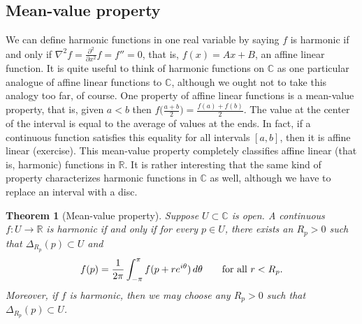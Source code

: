 \documentclass[12pt,openany]{book}
\newcommand{\avoidbreak}{\postdisplaypenalty=100}
\newcommand{\C}{{\mathbb{C}}}
\newcommand{\R}{{\mathbb{R}}}
\theoremstyle{plain}
\newtheorem{thm}{Theorem}[section]
\theoremstyle{remark}
\theoremstyle{definition}
\theoremstyle{exercise}
\theoremstyle{example}
\begin{document}
\subsection{Mean-value property}

We can define harmonic functions in one real variable
by saying $f$ is harmonic if and only if
$\nabla^2 f = \frac{\partial^2}{\partial x^2} f = f'' = 0$, that is, $f(x) = Ax+B$, an affine
linear function.  It is quite useful to think of harmonic functions on $\C$ as one
particular analogue of affine linear functions to $\C$, although we ought
not to take this analogy too far, of course.
One property of affine linear functions is a mean-value property, that is,
given $a < b$ then $f\bigl(\frac{a+b}{2}\bigr) = \frac{f(a)+f(b)}{2}$.  The
value at the center of the interval is equal to the average of values at the
ends.  In fact, if a continuous function satisfies this equality for all
intervals $[a,b]$, then it is
affine linear (exercise).  This mean-value property completely classifies affine
linear (that is, harmonic) functions in $\R$.
It is rather interesting that the same kind of property characterizes
harmonic functions in $\C$ as well, although we have to replace an interval
with a disc.

\begin{thm}[Mean-value property]\label{thm:meanprop}
\pagebreak[0]
Suppose $U \subset \C$ is open.
A continuous 
$f \colon U \to \R$
is harmonic if and only if for every $p \in U$, there exists an $R_p >0$
such that $\Delta_{R_p}(p) \subset U$ and
\begin{equation*}
f(p) = \frac{1}{2\pi} \int_{-\pi}^{\pi} f(p+re^{i\theta})\, d\theta
\qquad \text{for all } r < R_p .
\avoidbreak
\end{equation*}
Moreover, if $f$ is harmonic, then we may choose any
$R_p > 0$ such that $\Delta_{R_p}(p) \subset U$.
\end{thm}
\end{document}

